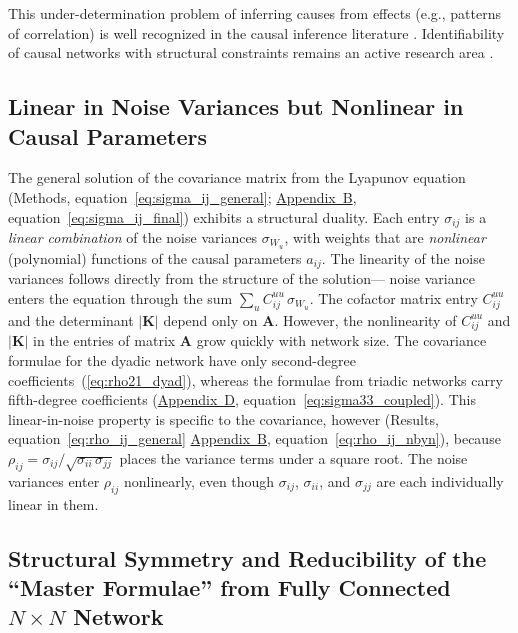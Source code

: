 \documentclass[12pt]{article}
\begin{document}
This under-determination problem of inferring causes from effects (e.g., patterns of correlation) is well recognized in the causal
inference literature \citep{Pearl2009, PetersJanzingScholkopf2017,
SpirtesGlymourScheines2000}. Identifiability of causal networks with
structural constraints remains an active research area
\citep{VarandoHansen2020, DettlingEtAl2023}.


\subsection*{Linear in Noise Variances but Nonlinear in Causal Parameters}

The general solution of the covariance matrix from the Lyapunov equation
(Methods, equation~\ref{eq:sigma_ij_general};
\hyperref[app:appB]{Appendix~B}, equation~\ref{eq:sigma_ij_final})
exhibits a structural duality. Each entry
$\sigma_{ij}$ is a \textit{linear combination} of the noise
variances $\sigma_{W_u}$, with weights that are
\textit{nonlinear} (polynomial) functions of the causal
parameters $a_{ij}$.
The linearity of the noise variances follows directly from the structure of
the solution---
noise variance enters the equation through the sum
$\sum_{u} C_{ij}^{uu}\,\sigma_{W_u}$. The cofactor matrix entry $C_{ij}^{uu}$ and the
determinant $|\mathbf{K}|$ depend only on $\mathbf{A}$. However, the
nonlinearity of $C_{ij}^{uu}$ and $|\mathbf{K}|$ in the entries of matrix $\mathbf{A}$ grow quickly with network size.
The covariance formulae for the dyadic network have only second-degree
coefficients~(\ref{eq:rho21_dyad}), whereas the formulae from triadic networks carry fifth-degree coefficients
(\hyperref[app:appD]{Appendix~D}, equation~\ref{eq:sigma33_coupled}). This linear-in-noise property is specific to the covariance, however
(Results, equation~\ref{eq:rho_ij_general}
\hyperref[app:appB]{Appendix~B}, equation~\ref{eq:rho_ij_nbyn}),
because $\rho_{ij}=\sigma_{ij}/\sqrt{\sigma_{ii}\,\sigma_{jj}}$
places the variance terms under a square root. The noise
variances enter $\rho_{ij}$ nonlinearly, even though
$\sigma_{ij}$, $\sigma_{ii}$, and $\sigma_{jj}$ are each
individually linear in them.


\subsection*{Structural Symmetry and Reducibility of the
             ``Master Formulae'' from Fully Connected $N\times N$
             Network}
\end{document}
